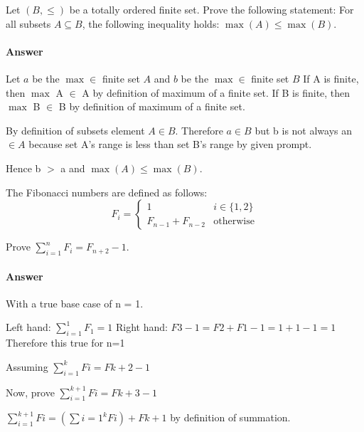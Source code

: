\documentclass{article}
\begin{document}
 

Let $(B,\leq)$ be a totally ordered finite set. Prove the following
statement: For all subsets $A \subseteq B$, the following inequality
holds: $\max(A) \leq \max(B)$.

\paragraph{Answer}

Let $a$ be the $\max \in$ finite set $A$ and $b$ be the $\max \in$ finite set $B$
If A is finite, then $\max$ A $\in$ A by definition of maximum of a finite set.
If B is finite, then $\max$ B $\in$ B by definition of maximum of a finite set.

By definition of subsets element $A \in B$. Therefore $a \in B$ but b is not always
an $\in A$ because set A's range is less than set B's range by given prompt.

Hence b $>$ a and $\max(A) \leq \max(B)$.

 

The Fibonacci numbers are defined as follows:
$$
    F_i = \begin{cases}
            1 & i \in \{1,2\} \\
            F_{n-1}+F_{n-2} & \text{otherwise}
          \end{cases}
$$

Prove $\sum_{i=1}^n F_i = F_{n+2}-1$.

\paragraph{Answer}

With a true base case of n = 1.

Left hand: $\sum_{i=1}^1 F_1 = 1$
Right hand: $F{3}-1 = F{2}+F{1}-1 = 1+1-1 = 1$
Therefore this true for n=1

Assuming $\sum_{i=1}^k Fi = F{k+2}-1$

Now, prove $\sum_{i=1}^{k+1} Fi = F{k+3}-1$

$\sum_{i=1}^{k+1} Fi = (\sum{i=1}^k Fi) + F{k+1}$ by definition of summation.
\end{document}
